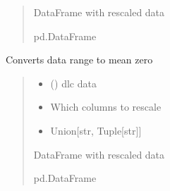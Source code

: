 \documentclass[letterpaper,10pt,english]{sphinxmanual}
\begin{document}
\begin{fulllineitems}
\begin{fulllineitems}
\begin{quote}
\begin{description}
\begin{itemize}
\end{itemize}

\sphinxAtStartPar
DataFrame with rescaled data

\sphinxAtStartPar
pd.DataFrame

\end{description}\end{quote}

\end{fulllineitems}


\begin{fulllineitems}
\label{\detokenize{BurrowFearConditioning:BurrowFearConditioning.DeepLabData.convert_to_mean_zero}}
\pysigstartsignatures
{}
\pysigstopsignatures
\sphinxAtStartPar
Converts data range to mean zero
\begin{quote}\begin{description}
\begin{itemize}
\item {} 
\sphinxAtStartPar
{} () \textendash{} dlc data

\item {} 
\sphinxAtStartPar
{} \textendash{} Which columns to rescale

\item {} 
\sphinxAtStartPar
{} \textendash{} Union{[}str, Tuple{[}str{]}{]}

\end{itemize}

\sphinxAtStartPar
DataFrame with rescaled data

\sphinxAtStartPar
pd.DataFrame


\end{description}
\end{quote}
\end{fulllineitems}
\end{fulllineitems}
\end{document}
